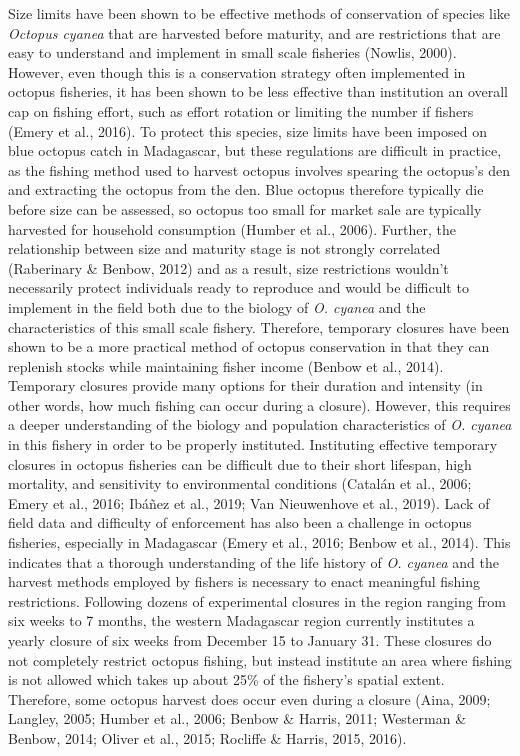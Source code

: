 \documentclass[
]{article}
\begin{document}
Size limits have been shown to be effective methods of conservation of species like \emph{Octopus cyanea} that are harvested before maturity, and are restrictions that are easy to understand and implement in small scale fisheries (Nowlis, 2000). However, even though this is a conservation strategy often implemented in octopus fisheries, it has been shown to be less effective than institution an overall cap on fishing effort, such as effort rotation or limiting the number if fishers (Emery et al., 2016). To protect this species, size limits have been imposed on blue octopus catch in Madagascar, but these regulations are difficult in practice, as the fishing method used to harvest octopus involves spearing the octopus's den and extracting the octopus from the den. Blue octopus therefore typically die before size can be assessed, so octopus too small for market sale are typically harvested for household consumption (Humber et al., 2006). Further, the relationship between size and maturity stage is not strongly correlated (Raberinary \& Benbow, 2012) and as a result, size restrictions wouldn't necessarily protect individuals ready to reproduce and would be difficult to implement in the field both due to the biology of \emph{O. cyanea} and the characteristics of this small scale fishery. Therefore, temporary closures have been shown to be a more practical method of octopus conservation in that they can replenish stocks while maintaining fisher income (Benbow et al., 2014). Temporary closures provide many options for their duration and intensity (in other words, how much fishing can occur during a closure). However, this requires a deeper understanding of the biology and population characteristics of \emph{O. cyanea} in this fishery in order to be properly instituted. Instituting effective temporary closures in octopus fisheries can be difficult due to their short lifespan, high mortality, and sensitivity to environmental conditions (Catalán et al., 2006; Emery et al., 2016; Ibáñez et al., 2019; Van Nieuwenhove et al., 2019). Lack of field data and difficulty of enforcement has also been a challenge in octopus fisheries, especially in Madagascar (Emery et al., 2016; Benbow et al., 2014). This indicates that a thorough understanding of the life history of \emph{O. cyanea} and the harvest methods employed by fishers is necessary to enact meaningful fishing restrictions. Following dozens of experimental closures in the region ranging from six weeks to 7 months, the western Madagascar region currently institutes a yearly closure of six weeks from December 15 to January 31. These closures do not completely restrict octopus fishing, but instead institute an area where fishing is not allowed which takes up about 25\% of the fishery's spatial extent. Therefore, some octopus harvest does occur even during a closure (Aina, 2009; Langley, 2005; Humber et al., 2006; Benbow \& Harris, 2011; Westerman \& Benbow, 2014; Oliver et al., 2015; Rocliffe \& Harris, 2015, 2016).
\end{document}
